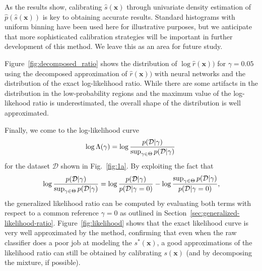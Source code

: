 \documentclass[12pt]{article}
\numberwithin{equation}{section}
\theoremstyle{plain}
\begin{document}
As the results show, calibrating $\hat s(\mathbf{x})$ through univariate density estimation of
$\hat p(\hat s(\mathbf{x}))$ is key to obtaining accurate results. Standard
histograms with uniform binning have been used here for illustrative purposes, but we
anticipate that more sophisticated calibration strategies will be important in further development
of this method. We leave this as an area for future study.

Figure~\ref{fig:decomposed_ratio} shows the distribution of $ \log \hat r(\mathbf{x}))$ for $\gamma=0.05$
using the decomposed approximation of $\hat r(\mathbf{x}))$ with neural networks and the distribution
of the exact log-likelihood ratio. While there are some artifacts in the distribution in the low-probability regions and the maximum value of the log-likehood ratio is underestimated, the overall shape of the distribution is well approximated.

Finally, we come to the log-likelihood curve
\begin{equation}
\log \Lambda( \gamma ) =  \log \frac{ p({\cal D} | \gamma ) }{ \sup_{\gamma \in \Theta} p({\cal D} | \gamma )} \;
\end{equation}
for the dataset $\mathcal{D}$ shown in  Fig.~\ref{fig:1a}.
By exploiting the fact that
\begin{equation}
\log \frac{ p({\cal D} | \gamma ) }{ \sup_{\gamma \in \Theta} p({\cal D} | \gamma )} = \log \frac{ p({\cal D} | \gamma ) }{ p({\cal D} | \gamma = 0 ) } - \log \frac{ \sup_{\gamma \in \Theta} p({\cal D} | \gamma) }{  p({\cal D} | \gamma = 0 ) },
\end{equation}
the generalized likelihood ratio can be computed by evaluating
both terms with respect to a common reference $\gamma=0$
as outlined in Section~\ref{sec:generalized-likelihood-ratio}.
Figure~\ref{fig:likelihood} shows that the exact likelihood curve is very well
approximated by the method, confirming that
even when the raw classifier does a poor job at modeling the $s^*(\mathbf{x})$, a good approximations of the
likelihood ratio can still be obtained by calibrating $s(\mathbf{x})$ (and by decomposing
the mixture, if possible).
\end{document}
